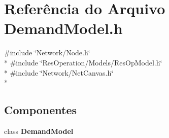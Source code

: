 \section{Referência do Arquivo Demand\+Model.\+h}
\label{_demand_model_8h}
{\ttfamily \#include \char`\"{}Network/\+Node.\+h\char`\"{}}\\*
{\ttfamily \#include \char`\"{}Res\+Operation/\+Models/\+Res\+Op\+Model.\+h\char`\"{}}\\*
{\ttfamily \#include \char`\"{}Network/\+Net\+Canvas.\+h\char`\"{}}\\*
\subsection*{Componentes}
\begin{DoxyCompactItemize}
\item 
class {\bf Demand\+Model}
\end{DoxyCompactItemize}
